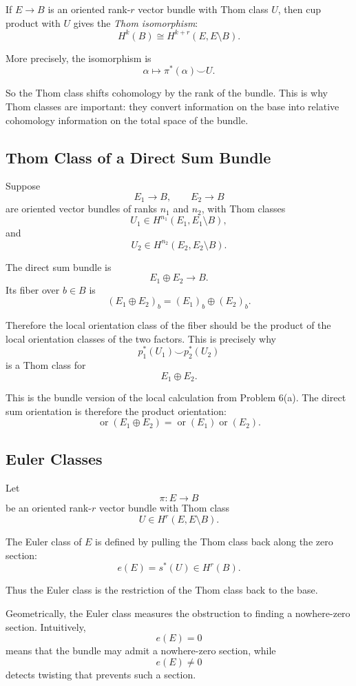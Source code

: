 \documentclass[12pt,a4paper]{article}
\theoremstyle{notespace}
\begin{document}
If \(E\to B\) is an oriented rank-\(r\) vector bundle with Thom class \(U\), then
cup product with \(U\) gives the \emph{Thom isomorphism}:
\[
H^k(B)
\cong
H^{k+r}(E,E\setminus B).
\]

More precisely, the isomorphism is
\[
\alpha\longmapsto \pi^*(\alpha)\smile U.
\]

So the Thom class shifts cohomology by the rank of the bundle. This is why Thom
classes are important: they convert information on the base into relative
cohomology information on the total space of the bundle.

\subsection{Thom Class of a Direct Sum Bundle}

Suppose
\[
E_1\to B,
\qquad
E_2\to B
\]
are oriented vector bundles of ranks \(n_1\) and \(n_2\), with Thom classes
\[
U_1\in H^{n_1}(E_1,E_1\setminus B),
\]
and
\[
U_2\in H^{n_2}(E_2,E_2\setminus B).
\]

The direct sum bundle is
\[
E_1\oplus E_2\to B.
\]
Its fiber over \(b\in B\) is
\[
(E_1\oplus E_2)_b
=
(E_1)_b\oplus (E_2)_b.
\]

Therefore the local orientation class of the fiber should be the product of the
local orientation classes of the two factors. This is precisely why
\[
p_1^*(U_1)\smile p_2^*(U_2)
\]
is a Thom class for
\[
E_1\oplus E_2.
\]

This is the bundle version of the local calculation from Problem 6(a). The direct
sum orientation is therefore the product orientation:
\[
\operatorname{or}(E_1\oplus E_2)
=
\operatorname{or}(E_1)\operatorname{or}(E_2).
\]

\subsection{Euler Classes}

Let
\[
\pi:E\to B
\]
be an oriented rank-\(r\) vector bundle with Thom class
\[
U\in H^r(E,E\setminus B).
\]

The Euler class of \(E\) is defined by pulling the Thom class back along the zero
section:
\[
e(E)=s^*(U)\in H^r(B).
\]

Thus the Euler class is the restriction of the Thom class back to the base.

Geometrically, the Euler class measures the obstruction to finding a nowhere-zero
section. Intuitively,
\[
e(E)=0
\]
means that the bundle may admit a nowhere-zero section, while
\[
e(E)\neq 0
\]
detects twisting that prevents such a section.
\end{document}
